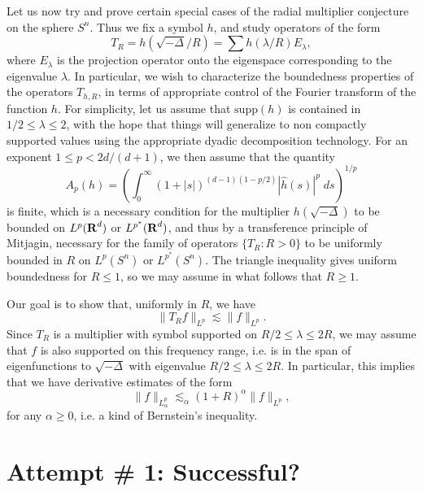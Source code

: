 Let us now try and prove certain special cases of the radial multiplier conjecture on the sphere $S^n$. Thus we fix a symbol $h$, and study operators of the form
%
\[ T_R = h \left( \sqrt{-\Delta} / R \right) = \sum h(\lambda / R) E_\lambda, \]
%
where $E_\lambda$ is the projection operator onto the eigenspace corresponding to the eigenvalue $\lambda$. In particular, we wish to characterize the boundedness properties of the operators $T_{h,R}$, in terms of appropriate control of the Fourier transform of the function $h$. For simplicity, let us assume that $\text{supp}(h)$ is contained in $1/2 \leq \lambda \leq 2$, with the hope that things will generalize to non compactly supported values using the appropriate dyadic decomposition technology. For an exponent $1 \leq p < 2d/(d+1)$, we then assume that the quantity
%
\[ A_p(h) = \left( \int_0^\infty (1 + |s|)^{(d-1)(1 - p/2)} |\widehat{h}(s)|^p\; ds \right)^{1/p} \]
%
is finite, which is a necessary condition for the multiplier $h(\sqrt{-\Delta})$ to be bounded on $L^p(\operatorname{\mathbf{R}}^d)$ or $L^{p^*}(\operatorname{\mathbf{R}}^d)$, and thus by a transference principle of Mitjagin, necessary for the family of operators $\{ T_R : R > 0 \}$ to be uniformly bounded in $R$ on $L^p(S^n)$ or $L^{p^*}(S^n)$. The triangle inequality gives uniform boundedness for $R \leq 1$, so we may assume in what follows that $R \geq 1$.

Our goal is to show that, uniformly in $R$, we have
%
\[ \| T_R f \|_{L^p} \lesssim \| f \|_{L^p}. \]
%
Since $T_R$ is a multiplier with symbol supported on $R/2 \leq \lambda \leq 2R$, we may assume that $f$ is also supported on this frequency range, i.e. is in the span of eigenfunctions to $\sqrt{-\Delta}$ with eigenvalue $R/2 \leq \lambda \leq 2R$. In particular, this implies that we have derivative estimates of the form
%
\[ \| f \|_{L^p_\alpha} \lesssim_\alpha (1 + R)^\alpha \| f \|_{L^p}, \]
%
for any $\alpha \geq 0$, i.e. a kind of Bernstein's inequality.

\section{Attempt \# 1: Successful?}

